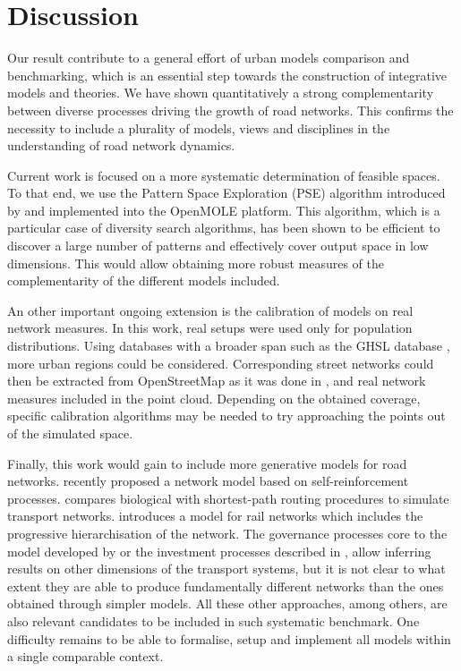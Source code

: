 \documentclass{article}
\begin{document}
\section{Discussion}

Our result contribute to a general effort of urban models comparison and benchmarking, which is an essential step towards the construction of integrative models and theories. We have shown quantitatively a strong complementarity between diverse processes driving the growth of road networks. This confirms the necessity to include a plurality of models, views and disciplines in the understanding of road network dynamics.

Current work is focused on a more systematic determination of feasible spaces. To that end, we use the Pattern Space Exploration (PSE) algorithm introduced by \cite{cherel2015beyond} and implemented into the OpenMOLE platform. This algorithm, which is a particular case of diversity search algorithms, has been shown to be efficient to discover a large number of patterns and effectively cover output space in low dimensions. This would allow obtaining more robust measures of the complementarity of the different models included.

An other important ongoing extension is the calibration of models on real network measures. In this work, real setups were used only for population distributions. Using databases with a broader span such as the GHSL database \cite{florczyk2019ghsl}, more urban regions could be considered. Corresponding street networks could then be extracted from OpenStreetMap as it was done in \cite{raimbault2019urban}, and real network measures included in the point cloud. Depending on the obtained coverage, specific calibration algorithms may be needed to try approaching the points out of the simulated space.

Finally, this work would gain to include more generative models for road networks. \cite{molinero2020model} recently proposed a network model based on self-reinforcement processes. \cite{queyroi2018biological} compares biological with shortest-path routing procedures to simulate transport networks. \cite{mimeur:tel-01451164} introduces a model for rail networks which includes the progressive hierarchisation of the network. The governance processes core to the model developed by \cite{raimbault2021introducing} or the investment processes described in \cite{cats2020modelling}, allow inferring results on other dimensions of the transport systems, but it is not clear to what extent they are able to produce fundamentally different networks than the ones obtained through simpler models. All these other approaches, among others, are also relevant candidates to be included in such systematic benchmark. One difficulty remains to be able to formalise, setup and implement all models within a single comparable context.
\end{document}
